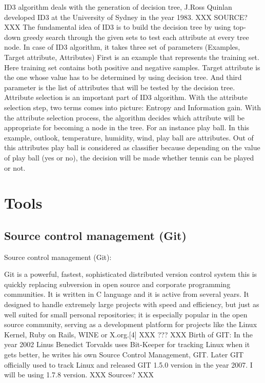 \documentclass{article}
\begin{document}
ID3 algorithm deals with the generation of decision tree, J.Ross Quinlan developed ID3 at the University of Sydney in the year 1983. XXX SOURCE? XXX The fundamental idea of ID3 is to build the decision tree by using top-down greedy search through the given sets to test each attribute at every tree node.
In case of ID3 algorithm, it takes three set of parameters
(Examples, Target attribute, Attributes)
First is an example that represents the training set. Here training set contains both positive and negative samples. Target attribute is the one whose value has to be determined by using decision tree. And third parameter is the list of attributes that will be tested by the decision tree. Attribute selection is an important part of ID3 algorithm. With the attribute selection step, two terms comes into picture: Entropy and Information gain. With the attribute selection process, the algorithm decides which attribute will be appropriate for becoming a node in the tree.
For an instance play ball. In this example, outlook, temperature, humidity, wind, play ball are attributes. Out of this attributes play ball is considered as classifier because depending on the value of play ball (yes or no), the decision will be made whether tennis can be played or not.


\section{Tools}
\label{sec:Tools}

\subsection{Source control management (Git)}
\label{sec:scm}

Source control management (Git):

Git is a powerful, fastest, sophisticated distributed version control system this is quickly replacing subversion in open source and corporate programming communities. It is written in C language and it is active from several years. It designed to handle extremely large projects with speed and efficiency,	but just as well suited for small personal repositories; it is especially popular in the open source community, serving as a development platform for projects like the Linux Kernel, Ruby on Rails, WINE or X.org.[4] XXX ??? XXX
Birth of GIT:
In the year 2002 Linus Benedict Torvalds uses Bit-Keeper for tracking Linux when it gets better, he writes his own Source Control Management, GIT. Later GIT officially used to track Linux and released GIT 1.5.0 version in the year 2007.
I will be using 1.7.8 version. XXX Sources? XXX
\end{document}
